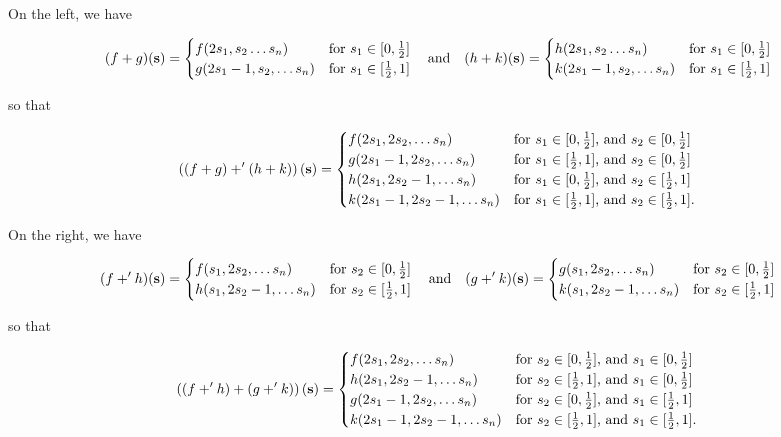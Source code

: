 \documentclass{article}
\begin{document}
On the left, we have

\[(f+g)(\mathbf{s}) = \begin{cases} f(2s_{1}, s_{2}\ldots s_{n}) & \textnormal{for } s_{1}\in [0, \frac{1}{2}]\\ g(2s_{1} - 1, s_{2},\ldots s_{n}) & \textnormal{for } s_{1}\in [\frac{1}{2}, 1] \end{cases}\quad \textnormal{and}\quad  (h+k)(\mathbf{s}) = \begin{cases} h(2s_{1}, s_{2}\ldots s_{n}) & \textnormal{for } s_{1}\in [0, \frac{1}{2}]\\ k(2s_{1} - 1, s_{2},\ldots s_{n}) & \textnormal{for } s_{1}\in [\frac{1}{2}, 1] \end{cases}
\]

so that

\[\left((f+g)+'(h+k)\right)(\mathbf{s}) = \begin{cases} f(2s_{1}, 2s_{2},\ldots s_{n}) & \textnormal{for } s_{1}\in [0, \frac{1}{2}] \textnormal{, and } s_{2}\in [0, \frac{1}{2}]\\ 
g(2s_{1} - 1, 2s_{2},\ldots s_{n}) & \textnormal{for } s_{1}\in [\frac{1}{2}, 1] \textnormal{, and } s_{2}\in [0, \frac{1}{2}]\\
h(2s_{1}, 2s_{2}-1,\ldots s_{n}) & \textnormal{for } s_{1}\in [0, \frac{1}{2}] \textnormal{, and } s_{2}\in [\frac{1}{2}, 1]\\
k(2s_{1} - 1, 2s_{2}-1,\ldots s_{n}) & \textnormal{for } s_{1}\in [\frac{1}{2}, 1] \textnormal{, and } s_{2}\in [\frac{1}{2}, 1]. \end{cases} \]

On the right, we have

\[(f+'h)(\mathbf{s}) = \begin{cases} f(s_{1}, 2s_{2},\ldots s_{n}) & \textnormal{for } s_{2}\in [0, \frac{1}{2}]\\ h(s_{1}, 2s_{2} - 1,\ldots s_{n}) & \textnormal{for } s_{2}\in [\frac{1}{2}, 1] \end{cases}\quad \textnormal{and}\quad  (g+'k)(\mathbf{s}) = \begin{cases} g(s_{1}, 2s_{2},\ldots s_{n}) & \textnormal{for } s_{2}\in [0, \frac{1}{2}]\\ k(s_{1}, 2s_{2} - 1,\ldots s_{n}) & \textnormal{for } s_{2}\in [\frac{1}{2}, 1] \end{cases}
\]

so that

\[\left((f+'h)+(g+'k)\right)(\mathbf{s}) = \begin{cases} f(2s_{1}, 2s_{2},\ldots s_{n}) & \textnormal{for } s_{2}\in [0, \frac{1}{2}] \textnormal{, and } s_{1}\in [0, \frac{1}{2}]\\ 
h(2s_{1}, 2s_{2}-1,\ldots s_{n}) & \textnormal{for } s_{2}\in [\frac{1}{2}, 1] \textnormal{, and } s_{1}\in [0, \frac{1}{2}]\\
g(2s_{1}-1, 2s_{2},\ldots s_{n}) & \textnormal{for } s_{2}\in [0, \frac{1}{2}] \textnormal{, and } s_{1}\in [\frac{1}{2}, 1]\\
k(2s_{1} - 1, 2s_{2}-1,\ldots s_{n}) & \textnormal{for } s_{2}\in [\frac{1}{2}, 1] \textnormal{, and } s_{1}\in [\frac{1}{2}, 1]. \end{cases} \]
\end{document}
